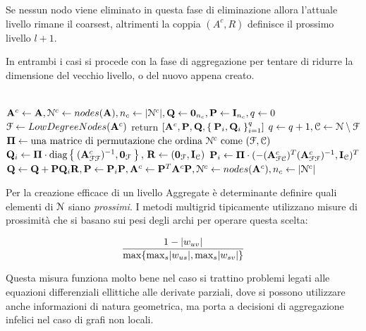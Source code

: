 Se nessun nodo viene eliminato in questa fase di eliminazione allora l'attuale livello rimane il coarsest, altrimenti la coppia $(A^c, R)$ definisce il prossimo livello $l+1$.

In entrambi i casi si procede con la fase di aggregazione per tentare di ridurre la dimensione del vecchio livello, o del nuovo appena creato.\\
\\
\begin{algorithm}
\caption{$[\A^c, \Pp, \Q, \Set{\Pp_i,\Q_i}_{i=1}^q] = Elimination(\A)$}\label{alg:Elimination}
\begin{algorithmic}[1]
\State $\mathbf{A}^c \gets \mathbf{A}, \mathcal{N}^c \gets nodes(\mathbf{A}), n_c \gets \lvert\mathcal{N}^c\rvert, \mathbf{Q} \gets \mathbf{0}_{n_c}, \mathbf{P} \gets \mathbf{I}_{n_c}, q \gets 0$
	\State $\mathcal{F} \gets LowDegreeNodes(\mathbf{A}^c)$
		\State return $[\mathbf{A}^c, \mathbf{P}, \mathbf{Q}, \Set{\mathbf{P}_i,\mathbf{Q}_i}_{i=1}^q]$
	\EndIf
	\State $q \gets q+1, \mathcal{C} \gets \mathcal{N} \setminus \mathcal{F}$
	\State $\mathbf{\Pi} \gets \text{una matrice di permutazione che ordina }\mathcal{N}^c \text{ come } (\mathcal{F},\mathcal{C})$
	\State $\mathbf{Q}_i \gets \mathbf{\Pi} \cdot \text{diag} \Set{(\mathbf{A}_{\mathcal{F}\mathcal{F}}^c)^{-1},\mathbf{0}_\mathcal{F}},\,\mathbf{R} \gets (\mathbf{0}_\mathcal{F}, \mathbf{I}_\mathcal{C})$
	\State $ \mathbf{P}_i \gets \mathbf{\Pi} \cdot ( -(\mathbf{A}_{\mathcal{F}\mathcal{C}}^c)^T(\mathbf{A}_{\mathcal{F}\mathcal{F}}^c)^{-1},\mathbf{I}_\mathcal{C})^T$
	\State $\mathbf{Q} \gets \mathbf{Q} + \mathbf{P}\mathbf{Q}_i\mathbf{R}, \mathbf{P} \gets \mathbf{P}_i\mathbf{P}, \mathbf{A}^c \gets \mathbf{P}^T\mathbf{A}^c\mathbf{P}, \mathcal{N}^c \gets nodes(\mathbf{A}^c), n_c \gets \lvert\mathcal{N}^c\rvert$
\EndWhile 
\end{algorithmic}
\end{algorithm}


Per la creazione efficace di un livello Aggregate è determinante definire quali elementi di $\mathcal{N}$ siano \emph{prossimi}.
I metodi multigrid tipicamente utilizzano misure di prossimità che si basano sui pesi degli archi per operare questa scelta:

\begin{equation}
\label{eqn:ClassicalAMGProximity}
\frac{1 - \lvert w_{uv}\rvert}{ \max \{ \max_s \lvert w_{us}\rvert , \max_s \lvert w_{sv}\rvert \}}
\end{equation}

Questa misura funziona molto bene nel caso si trattino problemi legati alle equazioni differenziali ellittiche alle derivate parziali, dove si possono utilizzare anche informazioni di natura geometrica, ma porta a decisioni di aggregazione infelici nel caso di grafi non locali.

